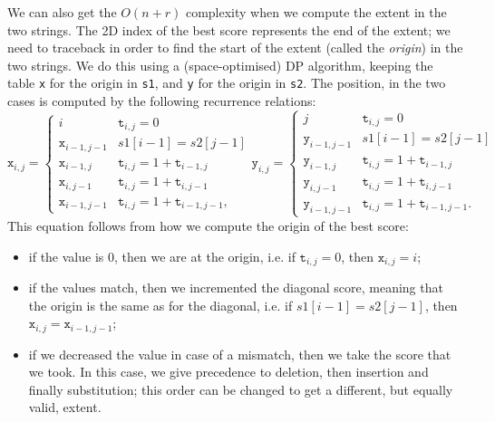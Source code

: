 \documentclass[a4paper, openany]{memoir}
\begin{document}
    We can also get the $O(n+r)$ complexity when we compute the extent in the two strings. The 2D index of the best score represents the end of the extent; we need to traceback in order to find the start of the extent (called the \emph{origin}) in the two strings. We do this using a (space-optimised) DP algorithm, keeping the table \texttt{x} for the origin in \texttt{s1}, and \texttt{y} for the origin in \texttt{s2}. The position, in the two cases is computed by the following recurrence relations:
\[\texttt{x}_{i, j} = \begin{cases}
    i & \texttt{t}_{i, j} = 0 \\
    \texttt{x}_{i-1, j-1} & s1[i-1] = s2[j-1] \\
    \texttt{x}_{i-1, j} & \texttt{t}_{i, j} = 1 + \texttt{t}_{i-1, j} \\
    \texttt{x}_{i, j-1} & \texttt{t}_{i, j} = 1 + \texttt{t}_{i, j-1} \\
    \texttt{x}_{i-1, j-1} & \texttt{t}_{i, j} = 1 + \texttt{t}_{i-1, j-1}, 
    \end{cases}
    \texttt{y}_{i, j} =  \begin{cases}
    j & \texttt{t}_{i, j} = 0 \\
    \texttt{y}_{i-1, j-1} & s1[i-1] = s2[j-1] \\
    \texttt{y}_{i-1, j} & \texttt{t}_{i, j} = 1 + \texttt{t}_{i-1, j} \\
    \texttt{y}_{i, j-1} & \texttt{t}_{i, j} = 1 + \texttt{t}_{i, j-1} \\
    \texttt{y}_{i-1, j-1} & \texttt{t}_{i, j} = 1 + \texttt{t}_{i-1, j-1}.
\end{cases}\]
    \noindent This equation follows from how we compute the origin of the best score:
    \begin{itemize}
        \item if the value is 0, then we are at the origin, i.e. if $\texttt{t}_{i, j} = 0$, then $\texttt{x}_{i, j} = i$;
        \item if the values match, then we incremented the diagonal score, meaning that the origin is the same as for the diagonal, i.e. if $s1[i-1] = s2[j-1]$, then $\texttt{x}_{i, j} = \texttt{x}_{i-1, j-1}$;
        \item if we decreased the value in case of a mismatch, then we take the score that we took. In this case, we give precedence to deletion, then insertion and finally substitution; this order can be changed to get a different, but equally valid, extent.
    \end{itemize}
\end{document}
